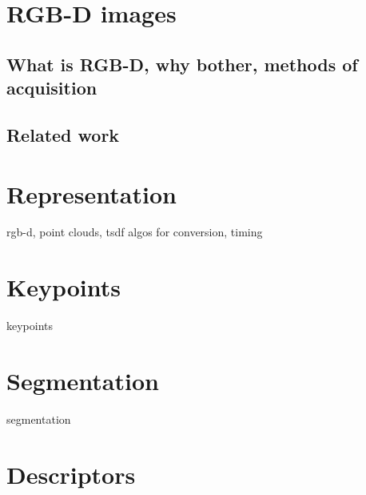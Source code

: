 \chapter{RGB-D images}
\label{cha:chap1}


\section{What is RGB-D, why bother, methods of acquisition}
\label{sec:motivation}


\section{Related work}
\label{sec:relatedWork}


\chapter{Representation}
\label{cha:representation}

rgb-d, point clouds, tsdf
algos for conversion, timing


\chapter{Keypoints}
\label{cha:keypoints}

keypoints


\chapter{Segmentation}
\label{cha:segmentation}

segmentation


\chapter{Descriptors}
\label{cha:descriptors}

